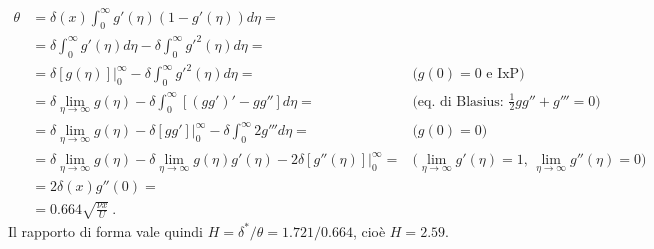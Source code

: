  \begin{equation}
 \begin{aligned}
  \theta   & = \delta(x) \int_0^\infty g'(\eta) (1 - g'(\eta)) d\eta = & \\
           & = \delta \int_0^\infty g'(\eta) d\eta 
                - \delta \int_0^\infty g'^2(\eta) d\eta = & \\
           & = \delta [g(\eta)]|_0^\infty 
                - \delta \int_0^\infty g'^2(\eta) d\eta = 
         & \text{($g(0)=0$ e IxP)} \\
           & = \delta \lim_{\eta \to \infty}  g(\eta) 
                - \delta \int_0^\infty [(g g')' - g g''] d\eta = 
         & \text{(eq. di Blasius: $\frac{1}{2}g g'' + g''' = 0$)} \\
           & = \delta \lim_{\eta \to \infty}  g(\eta) 
                - \delta [g g']|_0^\infty 
                - \delta \int_0^\infty 2 g''' d\eta = 
         & \text{($g(0) = 0$)}\\
           & = \delta \lim_{\eta \to \infty}  g(\eta)
                - \delta \lim_{\eta \to \infty}  g(\eta)g'(\eta)
                - 2 \delta [g''(\eta)]|_0^\infty = 
         & \text{($\lim_{\eta \to \infty} g'(\eta) = 1$, 
           $\lim_{\eta \to \infty} g''(\eta) = 0$)} \\
           & = 2 \delta(x) g''(0) = \\
           & = 0.664 \sqrt{\frac{\nu x}{U}} \ .
 \end{aligned}
 \end{equation}
% 
 Il rapporto di forma vale quindi $H = \delta^* / \theta = 1.721 / 0.664$, cioè
 $H = 2.59$.


